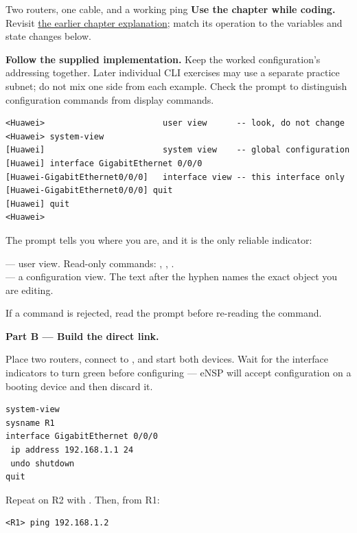 \begin{labproject}{Two routers, one cable, and a working ping}
\textbf{Use the chapter while coding.} Revisit \hyperref[ch:ensp-vrp]{the earlier chapter explanation}; match its operation to the variables and state changes below.

\textbf{Follow the supplied implementation.} Keep the worked configuration's addressing together. Later individual CLI exercises may use a separate practice subnet; do not mix one side from each example. Check the prompt to distinguish configuration commands from display commands.


\begin{lstlisting}[style=utpterminal]
<Huawei>                        user view      -- look, do not change
<Huawei> system-view
[Huawei]                        system view    -- global configuration
[Huawei] interface GigabitEthernet 0/0/0
[Huawei-GigabitEthernet0/0/0]   interface view -- this interface only
[Huawei-GigabitEthernet0/0/0] quit
[Huawei] quit
<Huawei>
\end{lstlisting}

\begin{keyidea}
The prompt tells you where you are, and it is the only reliable indicator:

 --- user view. Read-only commands: , , .\\
 --- a configuration view. The text after the hyphen names the exact object you are editing.

If a command is rejected, read the prompt before re-reading the command.
\end{keyidea}

\medskip\noindent\textbf{Part B --- Build the direct link.}\par
Place two routers, connect  to , and start both devices. Wait for the interface indicators to turn green before configuring --- eNSP will accept configuration on a booting device and then discard it.

\begin{lstlisting}[style=utpterminal]
system-view
sysname R1
interface GigabitEthernet 0/0/0
 ip address 192.168.1.1 24
 undo shutdown
quit
\end{lstlisting}

Repeat on R2 with . Then, from R1:

\begin{lstlisting}[style=utpterminal]
<R1> ping 192.168.1.2
\end{lstlisting}


\end{labproject}
